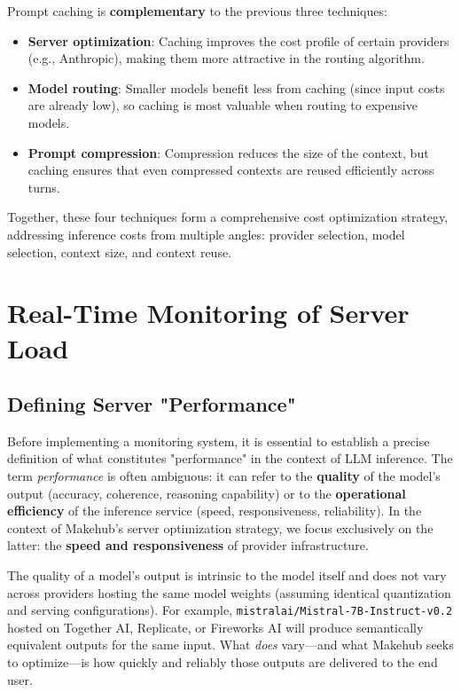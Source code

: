 \documentclass[english]{article}
\begin{document}
Prompt caching is \textbf{complementary} to the previous three techniques:
\begin{itemize}
    \item \textbf{Server optimization}: Caching improves the cost profile of certain providers (e.g., Anthropic), making them more attractive in the routing algorithm.
    \item \textbf{Model routing}: Smaller models benefit less from caching (since input costs are already low), so caching is most valuable when routing to expensive models.
    \item \textbf{Prompt compression}: Compression reduces the size of the context, but caching ensures that even compressed contexts are reused efficiently across turns.
\end{itemize}

Together, these four techniques form a comprehensive cost optimization strategy, addressing inference costs from multiple angles: provider selection, model selection, context size, and context reuse.


\newpage
\section{Real-Time Monitoring of Server Load}

\subsection{Defining Server "Performance"}

Before implementing a monitoring system, it is essential to establish a precise definition of what constitutes "performance" in the context of LLM inference. The term \emph{performance} is often ambiguous: it can refer to the \textbf{quality} of the model's output (accuracy, coherence, reasoning capability) or to the \textbf{operational efficiency} of the inference service (speed, responsiveness, reliability). In the context of Makehub's server optimization strategy, we focus exclusively on the latter: the \textbf{speed and responsiveness} of provider infrastructure.

The quality of a model's output is intrinsic to the model itself and does not vary across providers hosting the same model weights (assuming identical quantization and serving configurations). For example, \texttt{mistralai/Mistral-7B-Instruct-v0.2} hosted on Together AI, Replicate, or Fireworks AI will produce semantically equivalent outputs for the same input. What \emph{does} vary—and what Makehub seeks to optimize—is how quickly and reliably those outputs are delivered to the end user.
\end{document}
